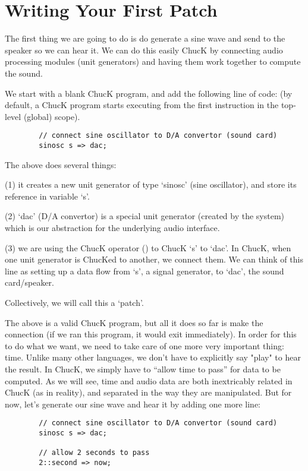 \section{Writing Your First Patch}

The first thing we are going to do is do generate a sine wave and send to the speaker so we can hear it. We can do this easily ChucK by connecting audio processing modules (unit generators) and having them work together to compute the sound. 

We start with a blank ChucK program, and add the following line of code: (by default, a ChucK program starts executing from the first instruction in the top-level (global) scope).
\begin{verbatim}
        // connect sine oscillator to D/A convertor (sound card)
        sinosc s => dac;
\end{verbatim}

The above does several things: 

(1) it creates a new unit generator of type `sinosc' (sine oscillator), and store its reference in variable `s'. 

(2) `dac' (D/A convertor) is a special unit generator (created by the system) which is our abstraction for the underlying audio interface. 

(3) we are using the ChucK operator (\chuckop) to ChucK `s' to `dac'. In ChucK, when one unit generator is ChucKed to another, we connect them. We can think of this line as setting up a data flow from `s', a signal generator, to `dac', the sound card/speaker. 

Collectively, we will call this a `patch'. 

The above is a valid ChucK program, but all it does so far is make the connection (if we ran this program, it would exit immediately). In order for this to do what we want, we need to take care of one more very important thing: time. Unlike many other languages, we don't have to explicitly say "play" to hear the result. In ChucK, we simply have to ``allow time to pass'' for data to be computed. As we will see, time and audio data are both inextricably related in ChucK (as in reality), and separated in the way they are manipulated. But for now, let's generate our sine wave and hear it by adding one more line:

\begin{verbatim}
        // connect sine oscillator to D/A convertor (sound card)
        sinosc s => dac;

        // allow 2 seconds to pass
        2::second => now;
\end{verbatim}


